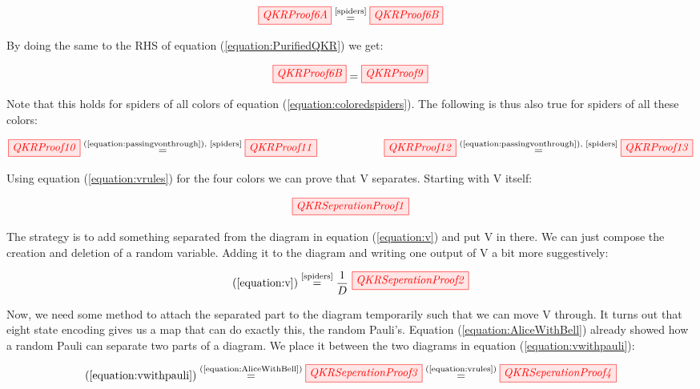 \documentclass[]{article}
\newcommand{\equaltext}[1]{\ensuremath{\stackrel{\text{#1}}{=}}}
\begin{document}
\begin{equation}
	\tikzfig{QKRProof6A} \equaltext{\ref{spiders}} \tikzfig{QKRProof6B}
\end{equation}

By doing the same to the RHS of equation (\ref{equation:PurifiedQKR}) we get:

\begin{equation}
	\label{equation:passingvonthrough}
	 \tikzfig{QKRProof6B} = \tikzfig{QKRProof9}
\end{equation}

Note that this holds for spiders of all colors of equation (\ref{equation:coloredspiders}). The following is thus also true for spiders of all these colors:

\begin{equation}
\label{equation:vrules}
	\tikzfig{QKRProof10} \equaltext{(\ref{equation:passingvonthrough}), \ref{spiders}} \tikzfig{QKRProof11} ~~~~~~~~~~~~~~~~~~ \tikzfig{QKRProof12} \equaltext{(\ref{equation:passingvonthrough}), \ref{spiders}} \tikzfig{QKRProof13}
\end{equation}

Using equation (\ref{equation:vrules}) for the four colors we can prove that V separates. Starting with V itself:

\begin{equation}
	\label{equation:v}
	\tikzfig{QKRSeperationProof1}
\end{equation}

The strategy is to add something separated from the diagram in equation (\ref{equation:v}) and put V in there. We can just compose the creation and deletion of a random variable. Adding it to the diagram and writing one output of V a bit more suggestively:

\begin{equation}
	\label{equation:vwithpauli}
	(\ref{equation:v}) \equaltext{\ref{spiders}} \frac{1}{D}~
	\tikzfig{QKRSeperationProof2}
\end{equation}

Now, we need some method to attach the separated part to the diagram temporarily such that we can move V through. It turns out that eight state encoding gives us a map that can do exactly this, the random Pauli's. Equation (\ref{equation:AliceWithBell}) already showed how a random Pauli can separate two parts of a diagram. We place it between the two diagrams in equation (\ref{equation:vwithpauli}):

\begin{equation}
(\ref{equation:vwithpauli}) \equaltext{(\ref{equation:AliceWithBell})} \tikzfig{QKRSeperationProof3} \equaltext{(\ref{equation:vrules})} \tikzfig{QKRSeperationProof4}
\end{equation}
\end{document}
